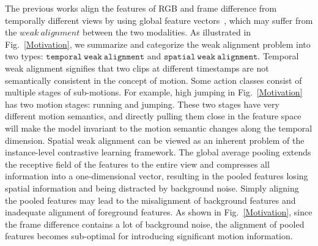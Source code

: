 \documentclass[sigconf,screen]{acmart}
\begin{document}
The previous works align the features of RGB and frame difference from temporally different views by using global feature vectors~\cite{Dual,improvedIIC}, which may suffer from the $\mathit{weak~alignment}$ between the two modalities. 
As illustrated in Fig.~\ref{Motivation}, we summarize and categorize the weak alignment problem into two types: $\mathtt{temporal~weak~alignment}$ and $\mathtt{spatial~weak~alignment}$.
Temporal weak alignment signifies that two clips at different timestamps are not semantically consistent in the concept of motion. Some action classes consist of multiple stages of sub-motions. For example, high jumping in Fig.~\ref{Motivation} has two motion stages: running and jumping. These two stages have very different motion semantics, and directly pulling them close in the feature space will make the model invariant to the motion semantic changes along the temporal dimension. 
Spatial weak alignment can be viewed as an inherent problem of the instance-level contrastive learning framework. The global average pooling extends the receptive field of the features to the entire view and compresses all information into a one-dimensional vector, resulting in the pooled features losing spatial information and being distracted by background noise. Simply aligning the pooled features may lead to the misalignment of background features and inadequate alignment of foreground features. As shown in Fig.~\ref{Motivation}, since the frame difference contains a lot of background noise, the alignment of pooled features becomes sub-optimal for introducing significant motion information.
\end{document}
